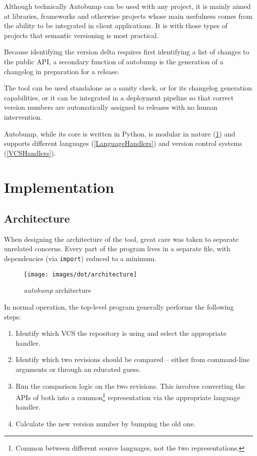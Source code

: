 \documentclass{l4proj}
\begin{document}
Although technically Autobump can be used with any project, it is
mainly aimed at libraries, frameworks and otherwise projects whose
main usefulness comes from the ability to be integrated in client
applications. It is with those types of projects that semantic
versioning is most practical.

Because identifying the version delta requires first identifying a
list of changes to the public API, a secondary function of autobump is
the generation of a changelog in preparation for a release.

The tool can be used standalone as a sanity check, or for its
changelog generation capabilities, or it can be integrated in a
deployment pipeline so that correct version numbers are automatically
assigned to releases with no human intervention.

Autobump, while its core is written in Python, is modular in
nature (\ref{Architecture}) and supports different
languages (\ref{LanguageHandlers}) and version control
systems (\ref{VCSHandlers}).

\chapter{Implementation}

\label{Architecture}
\section{Architecture}

When designing the architecture of the tool, great care was taken to
separate unrelated concerns. Every part of the program lives in a
separate file, with dependencies (via \texttt{import}) reduced to a minimum.

\begin{minipage}{0.5\textwidth}
\begin{figure}[H]
\centering
\texttt{[image: images/dot/architecture]}
\caption{\textit{autobump} architecture}
\end{figure}
\end{minipage}
\begin{minipage}{0.5\textwidth}
In normal operation, the top-level program generally performs the
following steps:

\begin{enumerate}
\item Identify which VCS the repository is using and select the
appropriate handler.
\item Identify which two revisions should be compared -- either from
command-line arguments or through an educated guess.
\item Run the comparison logic on the two revisions. This involves
converting the APIs of both into a common\footnote{Common between
different source languages, not the two representations.} representation via
the appropriate language handler.
\item Calculate the new version number by bumping the old one.
\end{enumerate}
\end{minipage}
\end{document}
